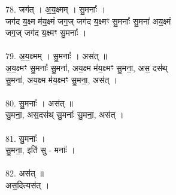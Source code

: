 78. जग॑त् । अ॒य॒क्ष्मम् । सु॒मनाः᳚ ।\\
जग॑द य॒क्ष्म म॑य॒क्ष्मं जग॒ज् जग॑द य॒क्ष्मꣳ सु॒मनाः᳚ सु॒मना॑ अय॒क्ष्मं\\
जग॒ज् जग॑द य॒क्ष्मꣳ सु॒मनाः᳚ ।\\
\\
79. अ॒य॒क्ष्मम् । सु॒मनाः᳚ । अस॑त् ॥\\
अ॒य॒क्ष्मꣳ सु॒मनाः᳚ सु॒मना॑, अय॒क्ष्म म॑य॒क्ष्मꣳ सु॒मना॒, अस॒ दस॑थ्\\
सु॒मना॑, अय॒क्ष्म म॑य॒क्ष्मꣳ सु॒मना॒, अस॑त् ।\\
\\
80. सु॒मनाः᳚ । अस॑त् ॥\\
सु॒मना॒, अस॒दस॑थ् सु॒मनाः᳚ सु॒मना॒, अस॑त् ।\\
\\
81. सु॒मनाः᳚ ।\\
सु॒मना॒, इति॑ सु - मनाः᳚ ।\\
\\
82. अस॑त् ॥\\
अस॒दित्यस॑त् ।\\
\\
